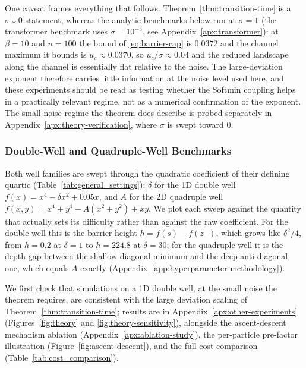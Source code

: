 \documentclass{article}
\theoremstyle{plain}
\theoremstyle{definition}
\theoremstyle{remark}
\begin{document}
One caveat frames everything that follows. Theorem~\ref{thm:transition-time} is a $\sigma\downarrow0$ statement, whereas the analytic benchmarks below run at $\sigma=1$ (the transformer benchmark uses $\sigma=10^{-5}$, see Appendix~\ref{apx:transformer}): at $\beta=10$ and $n=100$ the bound of \eqref{eq:barrier-cap} is $0.0372$ and the channel maximum it bounds is $u_c\approx0.0370$, so $u_c/\sigma\approx0.04$ and the reduced landscape along the channel is essentially flat relative to the noise. The large-deviation exponent therefore carries little information at the noise level used here, and these experiments should be read as testing whether the Softmin coupling helps in a practically relevant regime, not as a numerical confirmation of the exponent. The small-noise regime the theorem does describe is probed separately in Appendix~\ref{apx:theory-verification}, where $\sigma$ is swept toward $0$.

\subsubsection{Double-Well and Quadruple-Well Benchmarks}
\label{apx:wells}

Both well families are swept through the quadratic coefficient of their defining quartic (Table~\ref{tab:general_settings}): $\delta$ for the 1D double well $f(x)=x^4-\delta x^2+0.05x$, and $A$ for the 2D quadruple well $f(x,y)=x^4+y^4-A(x^2+y^2)+xy$. We plot each sweep against the quantity that actually sets its difficulty rather than against the raw coefficient. For the double well this is the barrier height $h=f(s)-f(z_-)$, which grows like $\delta^2/4$, from $h=0.2$ at $\delta=1$ to $h=224.8$ at $\delta=30$; for the quadruple well it is the depth gap between the shallow diagonal minimum and the deep anti-diagonal one, which equals $A$ exactly (Appendix~\ref{app:hyperparameter-methodology}).

We first check that simulations on a 1D double well, at the small noise the theorem requires, are consistent with the large deviation scaling of Theorem~\ref{thm:transition-time}; results are in Appendix~\ref{apx:other-experiments} (Figures~\ref{fig:theory} and \ref{fig:theory-sensitivity}), alongside the ascent-descent mechanism ablation (Appendix~\ref{apx:ablation-study}), the per-particle pre-factor illustration (Figure~\ref{fig:ascent-descent}), and the full cost comparison (Table~\ref{tab:cost_comparison}).
\end{document}
